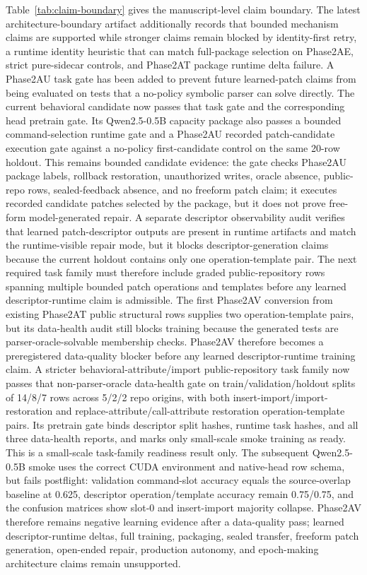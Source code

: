 \documentclass[11pt]{article}
\begin{document}
Table~\ref{tab:claim-boundary} gives the manuscript-level claim boundary. The
latest architecture-boundary artifact additionally records that bounded
mechanism claims are supported while stronger claims remain blocked by
identity-first retry, a runtime identity heuristic that can match full-package
selection on Phase2AE, strict pure-sidecar controls, and Phase2AT package
runtime delta failure. A Phase2AU task gate has been added to prevent future
learned-patch claims from being evaluated on tests that a no-policy symbolic
parser can solve directly. The current behavioral candidate now passes that
task gate and the corresponding head pretrain gate. Its Qwen2.5-0.5B capacity
package also passes a bounded command-selection runtime gate and a Phase2AU
recorded patch-candidate execution gate against a no-policy first-candidate
control on the same 20-row holdout. This remains bounded candidate evidence:
the gate checks Phase2AU package labels, rollback restoration, unauthorized
writes, oracle absence, public-repo rows, sealed-feedback absence, and no
freeform patch claim; it executes recorded candidate patches selected by the
package, but it does not prove free-form model-generated repair. A separate
descriptor observability audit verifies that learned patch-descriptor outputs
are present in runtime artifacts and match the runtime-visible repair mode, but
it blocks descriptor-generation claims because the current holdout contains only
one operation-template pair. The next required task family must therefore
include graded public-repository rows spanning multiple bounded patch operations
and templates before any learned descriptor-runtime claim is admissible. The
first Phase2AV conversion from existing Phase2AT public structural rows supplies
two operation-template pairs, but its data-health audit still blocks training
because the generated tests are parser-oracle-solvable membership checks.
Phase2AV therefore becomes a preregistered data-quality blocker before any
learned descriptor-runtime training claim. A stricter
behavioral-attribute/import public-repository task family now passes that
non-parser-oracle data-health gate on train/validation/holdout splits of
14/8/7 rows across 5/2/2 repo origins, with both
insert-import/import-restoration and replace-attribute/call-attribute
restoration operation-template pairs. Its pretrain gate binds descriptor split
hashes, runtime task hashes, and all three data-health reports, and marks only
small-scale smoke training as ready. This is a small-scale task-family
readiness result only. The subsequent Qwen2.5-0.5B smoke uses the correct CUDA
environment and native-head row schema, but fails postflight: validation
command-slot accuracy equals the source-overlap baseline at 0.625, descriptor
operation/template accuracy remain 0.75/0.75, and the confusion matrices show
slot-0 and insert-import majority collapse. Phase2AV therefore remains negative
learning evidence after a data-quality pass; learned descriptor-runtime deltas,
full training, packaging, sealed transfer, freeform patch generation,
open-ended repair, production autonomy, and epoch-making architecture claims
remain unsupported.
\end{document}
